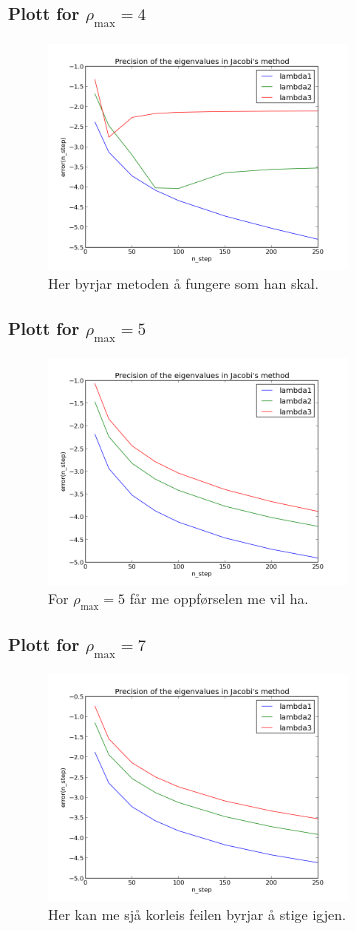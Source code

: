 \documentclass[11pt, a4paper]{article}
\begin{document}
    \subsubsection{Plott for $\rho_{\text{max}} = 4$}
      \begin{figure}[H]
        \centering
        \includegraphics[width=300px]{feil4.png}
        \caption{Her byrjar metoden å fungere som han skal.}
      \end{figure}

    \subsubsection{Plott for $\rho_{\text{max}} = 5$}
      \begin{figure}[H]
        \centering
        \includegraphics[width=300px]{feil5.png}
        \caption{For $\rho_{\text{max}} = 5$ får me oppførselen me vil ha.}
      \end{figure}

    \subsubsection{Plott for $\rho_{\text{max}} = 7$}
      \begin{figure}[H]
        \centering
        \includegraphics[width=300px]{feil7.png}
        \caption{Her kan me sjå korleis feilen byrjar å stige igjen.}
      \end{figure}
\end{document}
